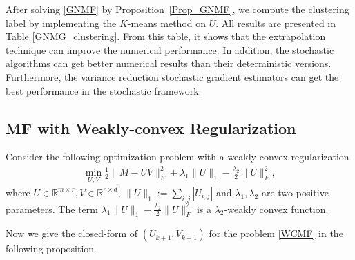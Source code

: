 \documentclass[letterpaper]{article} %
\begin{document}
	After solving \eqref{GNMF} by Proposition~\ref{Prop_GNMF}, we compute the clustering label by implementing the $K$-means method \cite{litekmeans} on $U$. 
	All results are presented in Table \ref{GNMG_clustering}. 
	From this table, it shows that the extrapolation technique can improve the numerical performance. In addition, the stochastic algorithms can get better numerical results than their deterministic versions. Furthermore, the variance reduction stochastic gradient estimators can get the best performance in the stochastic framework.  
	
	\subsection{MF with Weakly-convex Regularization}\label{Sparse_NMF}
	
	Consider the following  optimization problem with a weakly-convex regularization \cite{YinLHX15, MaLH17} 
	\begin{eqnarray}
		\min_{U,V}\frac{1}{2}\|M-UV\|_{F}^{2}+\lambda_{1}\|U\|_{1}-\frac{\lambda_{2}}{2}\|U\|_{F}^{2},\label{WCMF}
	\end{eqnarray}
	where $U\in\mathbb{R}^{m\times r},V\in\mathbb{R}^{r\times d}$, $\|U\|_{1}:=\sum_{i,j}|U_{i,j}|$ and $\lambda_{1},\lambda_{2}$ are two positive parameters. The term $\lambda_{1}\|U\|_{1}-\frac{\lambda_{2}}{2}\|U\|_{F}^{2}$ is a $\lambda_{2}$-weakly convex function. 
	
	Now we give the closed-form of $(U_{k+1}, V_{k+1})$ for the problem \eqref{WCMF}  in the following proposition.
	
\end{document}
